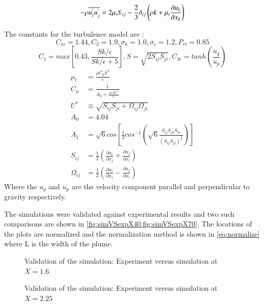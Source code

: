 \documentclass[preprint,12pt]{elsarticle}
\begin{document}
\begin{equation}
\centering
- \rho \overline{u^{'}_{i} u^{'}_{j}} = 2\mu_t S_{ij} - \frac{2}{3} \delta_{ij} \left( \rho k + \mu_t \frac{\partial u_k}{\partial x_k} \right)
\label{eq:reynoldsstress}
\end{equation}

The constants for the turbulence model are \cite{realizable,fluent} : 
\begin{equation}
\label{eq:constants}
C_{1\epsilon} = 1.44 , C_2 = 1.9 , \sigma_k = 1.0 , \sigma_\epsilon = 1.2 , P_{rt} = 0.85 
\end{equation}
\begin{equation}
C_1 = max\left[0.43,\frac{Sk/\epsilon}{Sk/\epsilon +5} \right] , S = \sqrt{2S_{ij}S_{ji}} , C_{3\epsilon} = tanh\left(\frac{u_g}{u_p}\right)
\end{equation}
\begin{subequations}
\begin{align}
\mu_t &= \frac{\rho C_{\mu} k^2}{\epsilon} \\
C_{\mu} &= \frac{1}{A_0 + \frac{A_1 k U^*}{\epsilon}} \\
U^* &\equiv \sqrt{S_{ij} S_{ji} + \Omega_{ij} \Omega_{ji}} \\
A_0 &= 4.04 \\
A_1 &= \sqrt{6} cos \left[\frac{1}{3} cos^{-1}\left(\sqrt{6} \frac{S_{ij}S_{jk}S_{ki}}{\left(S_{ij} S_{ji} \right)^{\frac{3}{2}}} \right) \right] \\
S_{ij} &= \frac{1}{2} \left( \frac{\partial u_i}{\partial x_j} + \frac{\partial u_j}{\partial x_i} \right) \\
\Omega_{ij} &= \frac{1}{2} \left( \frac{\partial u_i}{\partial x_j} - \frac{\partial u_j}{\partial x_i} \right)
\end{align}
\end{subequations}
Where the $u_g$ and $u_p$ are the velocity component parallel and perpendicular to gravity respectively.

The simulations were validated against experimental results and two such comparisons are shown in \cref{fig:simVSexpX40,fig:simVSexpX70}.  The locations of the plots are normalized and the normalization method is shown in \cref{eq:normalize} where L is the width of the plume.

\begin{figure}[!htbp]
	\centering
  \setlength\figureheight{6cm} 
	\setlength\figurewidth{6cm}
	
	\caption{Validation of the simulation: Experiment versus simulation at $X=1.6$ \cite{ijhmt1}}
	\label{fig:simVSexpX40}
\end{figure}
\begin{figure}[!htbp]
	\centering
	\setlength\figureheight{6cm} 
	\setlength\figurewidth{6cm}
	
	\caption{Validation of the simulation: Experiment versus simulation at $X=2.25$\cite{ijhmt1}}
	\label{fig:simVSexpX70}
\end{figure}
\end{document}
